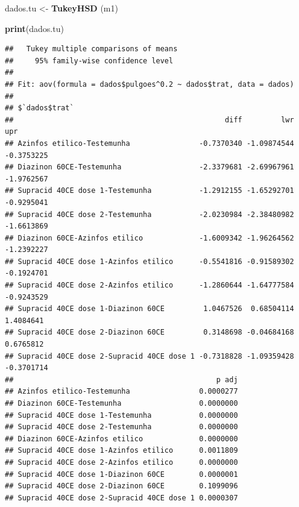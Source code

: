 \documentclass[
]{book}
\newenvironment{Shaded}{\begin{snugshade}}{\end{snugshade}}
\newcommand{\DataTypeTok}[1]{\textcolor[rgb]{0.13,0.29,0.53}{#1}}
\newcommand{\FloatTok}[1]{\textcolor[rgb]{0.00,0.00,0.81}{#1}}
\newcommand{\KeywordTok}[1]{\textcolor[rgb]{0.13,0.29,0.53}{\textbf{#1}}}
\newcommand{\NormalTok}[1]{#1}
\newcommand{\OperatorTok}[1]{\textcolor[rgb]{0.81,0.36,0.00}{\textbf{#1}}}
\newcommand{\StringTok}[1]{\textcolor[rgb]{0.31,0.60,0.02}{#1}}
\begin{document}
\begin{Shaded}
\end{Shaded}

\begin{Shaded}
\begin{Highlighting}[]
\NormalTok{dados.tu <-}\StringTok{ }\KeywordTok{TukeyHSD}\NormalTok{ (m1)}
\end{Highlighting}
\end{Shaded}

\begin{Shaded}
\begin{Highlighting}[]
\KeywordTok{print}\NormalTok{(dados.tu)}
\end{Highlighting}
\end{Shaded}

\begin{verbatim}
##   Tukey multiple comparisons of means
##     95% family-wise confidence level
## 
## Fit: aov(formula = dados$pulgoes^0.2 ~ dados$trat, data = dados)
## 
## $`dados$trat`
##                                                 diff         lwr        upr
## Azinfos etilico-Testemunha                -0.7370340 -1.09874544 -0.3753225
## Diazinon 60CE-Testemunha                  -2.3379681 -2.69967961 -1.9762567
## Supracid 40CE dose 1-Testemunha           -1.2912155 -1.65292701 -0.9295041
## Supracid 40CE dose 2-Testemunha           -2.0230984 -2.38480982 -1.6613869
## Diazinon 60CE-Azinfos etilico             -1.6009342 -1.96264562 -1.2392227
## Supracid 40CE dose 1-Azinfos etilico      -0.5541816 -0.91589302 -0.1924701
## Supracid 40CE dose 2-Azinfos etilico      -1.2860644 -1.64777584 -0.9243529
## Supracid 40CE dose 1-Diazinon 60CE         1.0467526  0.68504114  1.4084641
## Supracid 40CE dose 2-Diazinon 60CE         0.3148698 -0.04684168  0.6765812
## Supracid 40CE dose 2-Supracid 40CE dose 1 -0.7318828 -1.09359428 -0.3701714
##                                               p adj
## Azinfos etilico-Testemunha                0.0000277
## Diazinon 60CE-Testemunha                  0.0000000
## Supracid 40CE dose 1-Testemunha           0.0000000
## Supracid 40CE dose 2-Testemunha           0.0000000
## Diazinon 60CE-Azinfos etilico             0.0000000
## Supracid 40CE dose 1-Azinfos etilico      0.0011809
## Supracid 40CE dose 2-Azinfos etilico      0.0000000
## Supracid 40CE dose 1-Diazinon 60CE        0.0000001
## Supracid 40CE dose 2-Diazinon 60CE        0.1099096
## Supracid 40CE dose 2-Supracid 40CE dose 1 0.0000307
\end{verbatim}
\end{document}
